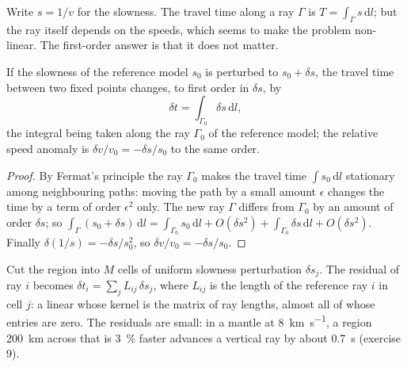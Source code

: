 Write $s = 1/v$ for the slowness. The travel time along a ray $\Gamma$ is
$T = \int_\Gamma s\,\mathrm dl$; but the ray itself depends on the speeds,
which seems to make the problem non-linear. The first-order answer is that it
does not matter.

\begin{proposition}\label{prop:b3:seismology-imaging:linear}
If the slowness of the reference model $s_0$ is perturbed to $s_0 + \delta s$,
the travel time between two fixed points changes, to first order in
$\delta s$, by
\[
  \delta t = \int_{\Gamma_0}\delta s\,\mathrm dl ,
\]
the integral being taken along the ray $\Gamma_0$ of the reference model; the
relative speed anomaly is $\delta v/v_0 = -\delta s/s_0$ to the same order.
\end{proposition}

\begin{proof}
By Fermat's principle the ray $\Gamma_0$ makes the travel time
$\int s_0\,\mathrm dl$ stationary among neighbouring paths: moving the path by a
small amount $\epsilon$ changes the time by a term of order $\epsilon^2$ only.
The new ray $\Gamma$ differs from $\Gamma_0$ by an amount of order $\delta s$;
so $\int_\Gamma(s_0 + \delta s)\,\mathrm dl = \int_{\Gamma_0}s_0\,\mathrm dl +
O(\delta s^2) + \int_{\Gamma_0}\delta s\,\mathrm dl + O(\delta s^2)$. Finally
$\delta(1/s) = -\delta s/s_0^2$, so $\delta v/v_0 = -\delta s/s_0$.
\end{proof}

Cut the region into $M$ cells of uniform slowness perturbation $\delta s_j$.
The residual of ray $i$ becomes $\delta t_i = \sum_j L_{ij}\,\delta s_j$, where
$L_{ij}$ is the length of the reference ray $i$ in cell $j$: a linear  whose kernel is the matrix of ray lengths, almost all of whose entries
are zero. The residuals are small: in a mantle at
\qty{8}{km.s^{-1}}, a region \qty{200}{km} across that is \qty{3}{\percent}
faster advances a vertical ray by about \qty{0.7}{s} (exercise 9).

